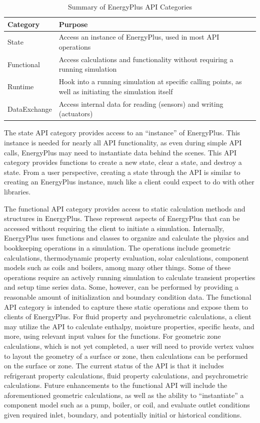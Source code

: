 \documentclass[5p, authoryear]{elsarticle}
\begin{document}
\begin{table}
\begin{center}
\caption{Summary of EnergyPlus API Categories}
\begin{tabular}{lp{2.25in}}
\toprule
Category     & Purpose \\
\midrule
State        & Access an instance of EnergyPlus, used in most API operations \\
Functional   & Access calculations and functionality without requiring a running simulation \\
Runtime      & Hook into a running simulation at specific calling points, as well as initiating the simulation itself \\
DataExchange & Access internal data for reading (sensors) and writing (actuators) \\ 
\bottomrule
\end{tabular}
\label{table:api:uses:classes}
\end{center}
\end{table}

The state API category provides access to an ``instance'' of EnergyPlus.
This instance is needed for nearly all API functionality, as even during simple API calls, EnergyPlus may need to instantiate data behind the scenes.
This API category provides functions to create a new state, clear a state, and destroy a state.
From a user perspective, creating a state through the API is similar to creating an EnergyPlus instance, much like a client could expect to do with other libraries.

The functional API category provides access to static calculation methods and structures in EnergyPlus.  
These represent aspects of EnergyPlus that can be accessed without requiring the client to initiate a simulation.
Internally, EnergyPlus uses functions and classes to organize and calculate the physics and bookkeeping operations in a simulation.
The operations include geometric calculations, thermodynamic property evaluation, solar calculations, component models such as coils and boilers, among many other things.
Some of these operations require an actively running simulation to calculate transient properties and setup time series data.
Some, however, can be performed by providing a reasonable amount of initialization and boundary condition data.
The functional API category is intended to capture these static operations and expose them to clients of EnergyPlus.
For fluid property and psychrometric calculations, a client may utilize the API to calculate enthalpy, moisture properties, specific heats, and more, using relevant input values for the functions.
For geometric zone calculations, which is not yet completed, a user will need to provide vertex values to layout the geometry of a surface or zone, then calculations can be performed on the surface or zone.
The current status of the API is that it includes refrigerant property calculations, fluid property calculations, and psychrometric calculations.
Future enhancements to the functional API will include the aforementioned geometric calculations, as well as the ability to ``instantiate'' a component model such as a pump, boiler, or coil, and evaluate outlet conditions given required inlet, boundary, and potentially initial or historical conditions.
\end{document}
